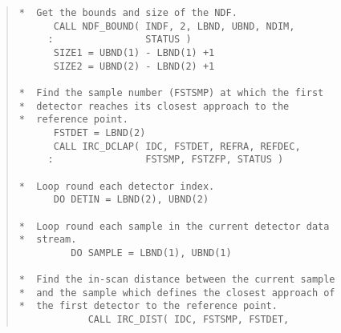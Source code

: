 \begin{quote}
\begin{tabbing}

\verb#*  Get the bounds and size of the NDF.                 #\\
\verb#      CALL NDF_BOUND( INDF, 2, LBND, UBND, NDIM,       #\\
\verb#     :                STATUS )                         #\\
\verb#      SIZE1 = UBND(1) - LBND(1) +1                     #\\
\verb#      SIZE2 = UBND(2) - LBND(2) +1                     #\\
\verb#                                                       #\\
\verb#*  Find the sample number (FSTSMP) at which the first  #\\
\verb#*  detector reaches its closest approach to the        #\\
\verb#*  reference point.                                    #\\
\verb#      FSTDET = LBND(2)                                 #\\
\verb#      CALL IRC_DCLAP( IDC, FSTDET, REFRA, REFDEC,      #\\
\verb#     :                FSTSMP, FSTZFP, STATUS )         #\\
\verb#                                                       #\\
\verb#*  Loop round each detector index.                     #\\
\verb#      DO DETIN = LBND(2), UBND(2)                      #\\
\verb#                                                       #\\
\verb#*  Loop round each sample in the current detector data #\\
\verb#*  stream.                                             #\\
\verb#         DO SAMPLE = LBND(1), UBND(1)                  #\\
\verb#                                                       #\\
\verb#*  Find the in-scan distance between the current sample#\\
\verb#*  and the sample which defines the closest approach of#\\
\verb#*  the first detector to the reference point.          #\\
\verb#            CALL IRC_DIST( IDC, FSTSMP, FSTDET,        #\\

\end{tabbing}
\end{quote}
